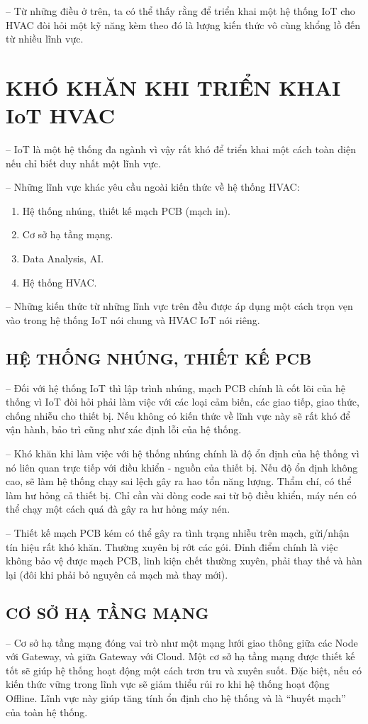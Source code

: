 -- Từ những điều ở trên, ta có thể thấy rằng để triển khai một hệ thống IoT cho HVAC đòi hỏi một kỹ năng kèm theo đó là lượng kiến thức vô cùng khổng lồ đến từ nhiều lĩnh vực. 
\section{KHÓ KHĂN KHI TRIỂN KHAI IoT HVAC}
-- IoT là một hệ thống đa ngành vì vậy rất khó để triển khai một cách toàn diện nếu chỉ biết duy nhất một lĩnh vực.

-- Những lĩnh vực khác yêu cầu ngoài kiến thức về hệ thống HVAC:
\begin{enumerate}
	\item Hệ thống nhúng, thiết kế mạch PCB (mạch in).
	\item Cơ sở hạ tầng mạng.
	\item Data Analysis, AI.
	\item Hệ thống HVAC.
\end{enumerate}

-- Những kiến thức từ những lĩnh vực trên đều được áp dụng một cách trọn vẹn vào trong hệ thống IoT nói chung và HVAC IoT nói riêng. 

\subsection{HỆ THỐNG NHÚNG, THIẾT KẾ PCB}
-- Đối với hệ thống IoT thì lập trình nhúng, mạch PCB chính là cốt lõi của hệ thống vì IoT đòi hỏi phải làm việc với các loại cảm biến, các giao tiếp, giao thức, chống nhiễu cho thiết bị. Nếu không có kiến thức về lĩnh vực này sẽ rất khó để vận hành, bảo trì cũng như xác định lỗi của hệ thống. 

-- Khó khăn khi làm việc với hệ thống nhúng chính là độ ổn định của hệ thống vì nó liên quan trực tiếp với điều khiển - nguồn của thiết bị. Nếu độ ổn định không cao, sẽ làm hệ thống chạy sai lệch gây ra hao tổn năng lượng. Thẩm chí, có thể làm hư hỏng cả thiết bị. Chỉ cần vài dòng code sai từ bộ điều khiển, máy nén có thể chạy một cách quá đà gây ra hư hỏng máy nén. 

-- Thiết kế mạch PCB kém có thể gây ra tình trạng nhiễu trên mạch, gửi/nhận tín hiệu rất khó khăn. Thường xuyên bị rớt các gói. Đỉnh điểm chính là việc không bảo vệ được mạch PCB, linh kiện chết thường xuyên, phải thay thế và hàn lại (đôi khi phải bỏ nguyên cả mạch mà thay mới). 

\subsection{CƠ SỞ HẠ TẦNG MẠNG}
-- Cơ sở hạ tầng mạng đóng vai trò như một mạng lưới giao thông giữa các Node với Gateway, và giữa Gateway với Cloud. Một cơ sở hạ tầng mạng được thiết kế tốt sẽ giúp hệ thống hoạt động một cách trơn tru và xuyên suốt. Đặc biệt, nếu có kiến thức vững trong lĩnh vực sẽ giảm thiểu rủi ro khi hệ thống hoạt động Offline. Lĩnh vực này giúp tăng tính ổn định cho hệ thống và là ``huyết mạch'' của toàn hệ thống.

